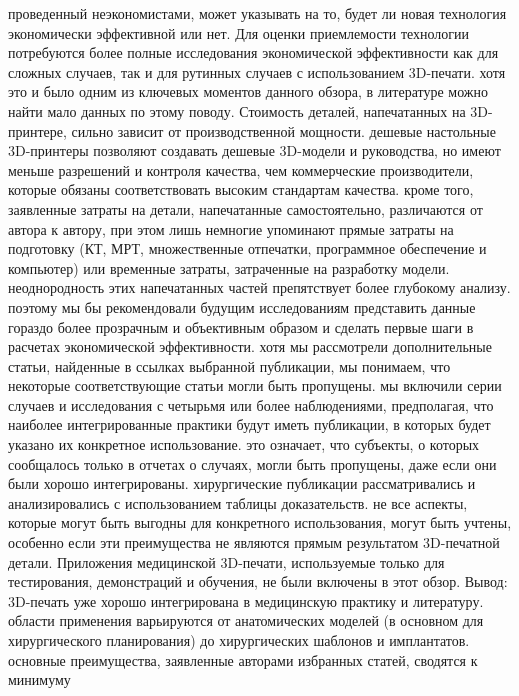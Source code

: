 проведенный неэкономистами, может указывать на то, будет ли новая технология
экономически эффективной или нет. Для оценки приемлемости технологии потребуются
более полные исследования экономической эффективности как для сложных случаев,
так и для рутинных случаев с использованием 3D-печати. хотя это и было одним из
ключевых моментов данного обзора, в литературе можно найти мало данных по этому
поводу. Стоимость деталей, напечатанных на 3D-принтере, сильно зависит от
производственной мощности. дешевые настольные 3D-принтеры позволяют создавать
дешевые 3D-модели и руководства, но имеют меньше разрешений и контроля качества,
чем коммерческие производители, которые обязаны соответствовать высоким
стандартам качества. кроме того, заявленные затраты на детали, напечатанные
самостоятельно, различаются от автора к автору, при этом лишь немногие упоминают
прямые затраты на подготовку (КТ, МРТ, множественные отпечатки, программное
обеспечение и компьютер) или временные затраты, затраченные на разработку
модели. неоднородность этих напечатанных частей препятствует более глубокому
анализу. поэтому мы бы рекомендовали будущим исследованиям представить данные
гораздо более прозрачным и объективным образом и сделать первые шаги в расчетах
экономической эффективности. хотя мы рассмотрели дополнительные статьи,
найденные в ссылках выбранной публикации, мы понимаем, что некоторые
соответствующие статьи могли быть пропущены. мы включили серии случаев и
исследования с четырьмя или более наблюдениями, предполагая, что наиболее
интегрированные практики будут иметь публикации, в которых будет указано их
конкретное использование. это означает, что субъекты, о которых сообщалось
только в отчетах о случаях, могли быть пропущены, даже если они были хорошо
интегрированы. хирургические публикации рассматривались и анализировались с
использованием таблицы доказательств. не все аспекты, которые могут быть выгодны
для конкретного использования, могут быть учтены, особенно если эти преимущества
не являются прямым результатом 3D-печатной детали. Приложения медицинской
3D-печати, используемые только для тестирования, демонстраций и обучения, не
были включены в этот обзор. Вывод: 3D-печать уже хорошо интегрирована в
медицинскую практику и литературу. области применения варьируются от
анатомических моделей (в основном для хирургического планирования) до
хирургических шаблонов и имплантатов. основные преимущества, заявленные авторами
избранных статей, сводятся к минимуму

